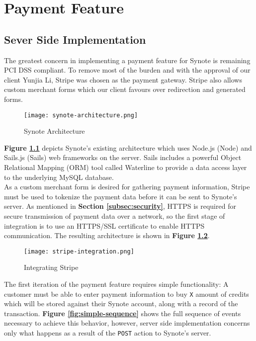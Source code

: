 \chapter{Payment Feature}
\label{chap:payment-feature}


\section{Sever Side Implementation}
\label{sec:server-side-implementation}

The greatest concern in implementing a payment feature for Synote is remaining PCI DSS compliant. To remove most of the burden and with the approval of our client Yunjia Li, Stripe was chosen as the payment gateway. Stripe also allows custom merchant forms which our client favours over redirection and generated forms.\\

\begin{figure}[!hbt]
  	\centering
 	\texttt{[image: synote-architecture.png]}
  	\caption{Synote Architecture}
 	\label{fig:synote-architecture}
\end{figure}

\textbf{Figure \ref{fig:synote-architecture}} depicts Synote's existing architecture which uses Node.js (Node) and Sails.js (Sails) web frameworks on the server. Sails includes a powerful Object Relational Mapping (ORM) tool called Waterline to provide a data access layer to the underlying MySQL database.\\

As a custom merchant form is desired for gathering payment information, Stripe must be used to tokenize the payment data before it can be sent to Synote's server. As mentioned in \textbf{Section \ref{subsec:security}}, HTTPS is required for secure transmission of payment data over a network, so the first stage of integration is to use an HTTPS/SSL certificate to enable HTTPS communication. The resulting architecture is shown in \textbf{Figure \ref{fig:stripe-integration}}.\\

\begin{figure}[!hbt]
  	\centering
 	\texttt{[image: stripe-integration.png]}
  	\caption{Integrating Stripe}
 	\label{fig:stripe-integration}
\end{figure}

The first iteration of the payment feature requires simple functionality: A customer must be able to enter payment information to buy \texttt{X} amount of credits which will be stored against their Synote account, along with a record of the transaction. \textbf{Figure \ref{fig:simple-sequence}} shows the full sequence of events necessary to achieve this behavior, however, server side implementation concerns only what happens as a result of the \texttt{POST} action to Synote's server.\\

